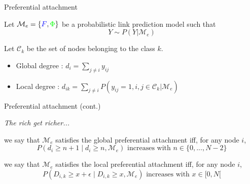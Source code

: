 \begin{frame}[c]{Preferential attachment}


    \begin{definition}[Degrees]
    Let $\mathcal{M}_e = \{ \textcolor{blue}{F}, \textcolor{green}{\Phi} \}$ be a probabilistic link prediction model such that 
    \[Y\sim P(Y|\mathcal{M}_e) \]

    Let $\mathcal{C}_k$ be the set of nodes belonging to the class $k$.

    \begin{itemize}
    \item Global degree : $d_i  = \sum_{j\neq i} y_{ij}$
    \item  Local degree :  $d_{ik}  = \sum_{j\neq i} P(y_{ij}=1, i,j\in \mathcal{C}_k | \mathcal{M}_e) $
    \end{itemize}
    \end{definition}





\end{frame}


\begin{frame}[c]{Preferential attachment (cont.)}

\emph{The rich get richer...}
\vspace{2em}

\begin{definition}
we say that $\mathcal{M}_e$ satisfies the global preferential attachment iff, for any node $i$, 
\[P(d_i \ge n+1 \mid d_i \ge n, \mathcal{M}_e) \textrm{ increases with } n \in \{0,..., N-2\} \]
\end{definition}

\begin{definition}
we say that  $\mathcal{M}_e$ satisfies the local preferential attachment iff, for any node $i$, 
\[P(D_{i,k} \ge x+\epsilon \mid D_{i,k} \ge x, \mathcal{M}_e) \textrm{ increases with } x \in [0,N[ \]
\end{definition}

\end{frame}

